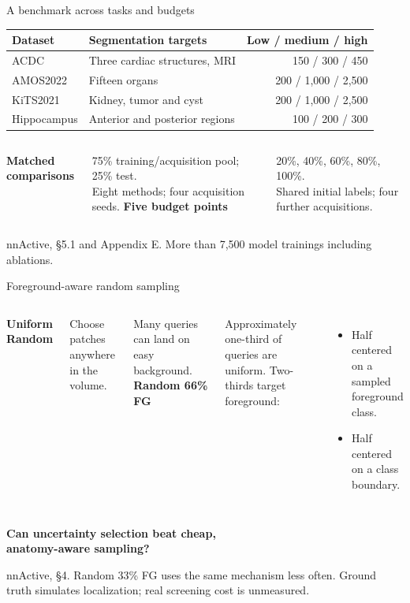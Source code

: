 \documentclass[aspectratio=169,11pt]{beamer}
\newcommand{\source}[1]{\vfill{\color{Muted}\fontsize{7}{9}\selectfont #1\par}}
\newcommand{\takeaway}[1]{\vspace{0.2cm}\begin{center}{\color{Accent}\large\bfseries #1}\end{center}}
\begin{document}
\begin{frame}{A benchmark across tasks and budgets}
\small\renewcommand{\arraystretch}{1.35}
\begin{tabular}{lp{.43\linewidth}r}
\textbf{Dataset} & \textbf{Segmentation targets} & \textbf{Low / medium / high}\\\midrule
ACDC & Three cardiac structures, MRI & 150 / 300 / 450\\
AMOS2022 & Fifteen organs & 200 / 1,000 / 2,500\\
KiTS2021 & Kidney, tumor and cyst & 200 / 1,000 / 2,500\\
Hippocampus & Anterior and posterior regions & 100 / 200 / 300\\\bottomrule
\end{tabular}\par
{}
\vspace{.35cm}
\begin{columns}[T,onlytextwidth]
\textbf{Matched comparisons}\par\small 75\% training/acquisition pool; 25\% test.\\Eight methods; four acquisition seeds.
\textbf{Five budget points}\par\small 20\%, 40\%, 60\%, 80\%, 100\%.\\Shared initial labels; four further acquisitions.
\end{columns}
\source{nnActive, \S5.1 and Appendix E. More than 7,500 model trainings including ablations.}
\end{frame}

\begin{frame}{Foreground-aware random sampling}
\begin{columns}[T,onlytextwidth]
{\color{Accent}\large\textbf{Uniform Random}}\par\vspace{.25cm}
Choose patches anywhere in the volume.\par\vspace{.25cm}
Many queries can land on easy background.
{\color{Teal}\large\textbf{Random 66\% FG}}\par\vspace{.25cm}
Approximately one-third of queries are uniform. Two-thirds target foreground:\par
\begin{itemize}\item Half centered on a sampled foreground class.\item Half centered on a class boundary.\end{itemize}
\end{columns}
\takeaway{Can uncertainty selection beat cheap,\\anatomy-aware sampling?}
\source{nnActive, \S4. Random 33\% FG uses the same mechanism less often. Ground truth simulates localization; real screening cost is unmeasured.}
\end{frame}
\end{document}
